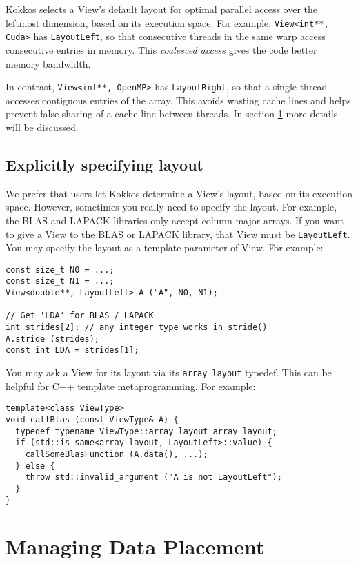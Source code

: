 Kokkos selects a View's default layout for optimal parallel access
over the leftmost dimension, based on its execution space.  For
example, \lstinline!View<int**, Cuda>! has \lstinline!LayoutLeft!, so that
consecutive threads in the same warp access consecutive entries in
memory.  This \emph{coalesced access} gives the code better memory
bandwidth.  

In contrast, \lstinline!View<int**, OpenMP>! has
\lstinline!LayoutRight!, so that a single thread accesses contiguous
entries of the array.  This avoids wasting cache lines and helps
prevent false sharing of a cache line between threads. 
In section \ref{S:View:Placement} more details will be discussed. 

\subsection{Explicitly specifying layout}\label{SS:View:Layout:Explicit}

We prefer that users let Kokkos determine a View's layout, based on
its execution space.  However, sometimes you really need to specify
the layout.  For example, the BLAS and LAPACK libraries only accept
column-major arrays.  If you want to give a View to the BLAS or
LAPACK library, that View must be \lstinline!LayoutLeft!.  You may specify the
layout as a template parameter of View.  For example:
\begin{lstlisting}
const size_t N0 = ...;
const size_t N1 = ...;
View<double**, LayoutLeft> A ("A", N0, N1);

// Get 'LDA' for BLAS / LAPACK
int strides[2]; // any integer type works in stride()
A.stride (strides);
const int LDA = strides[1];
\end{lstlisting}
You may ask a View for its layout via its \lstinline!array_layout! typedef.
This can be helpful for C++ template metaprogramming.  For example:
\begin{lstlisting}
template<class ViewType>
void callBlas (const ViewType& A) {
  typedef typename ViewType::array_layout array_layout;
  if (std::is_same<array_layout, LayoutLeft>::value) {
    callSomeBlasFunction (A.data(), ...);
  } else {
    throw std::invalid_argument ("A is not LayoutLeft");
  }
}
\end{lstlisting}

\section{Managing Data Placement}\label{S:View:Placement}

